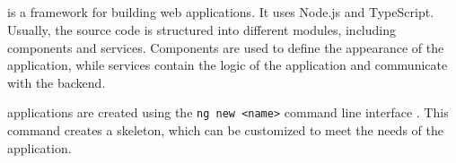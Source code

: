 \subsection{\angular{}}\label{sec:FE_angular}

\angular{} is a framework for building web applications.
It uses Node.js and TypeScript.
Usually, the source code is structured into different modules, including components and services.
Components are used to define the appearance of the application, while
services contain the logic of the application and communicate with the backend.

\angular{} applications are created using the \texttt{ng new <name>} command line interface \cite{angular_book2018}.
This command creates a skeleton, which can be customized to meet the needs of the application.
